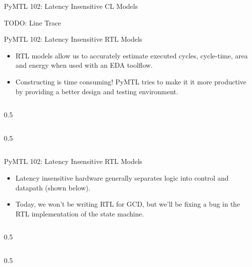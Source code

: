 \begin{frame}{PyMTL 102: Latency Insensitive CL Models}

TODO: Line Trace

\end{frame}

\begin{frame}{PyMTL 102: Latency Insensitive RTL Models}

\begin{itemize}
  \item RTL models allow us to accurately estimate executed cycles,
        cycle-time, area and energy when used with an EDA toolflow.
  \smallskip
  \item Constructing is time consuming! PyMTL tries to make it it more
        productive by providing a better design and testing environment.
\end{itemize}

  \begin{cbxcols}
  \begin{column}{0.5\tw}
  \end{column}
  \begin{column}{0.5\tw}
  \end{column}
  \end{cbxcols}
\end{frame}

\begin{frame}{PyMTL 102: Latency Insensitive RTL Models}

\begin{itemize}
  \item Latency insensitive hardware generally separates logic into
        control and datapath (shown below).
  \smallskip
  \item Today, we won’t be writing RTL for GCD, but we’ll be fixing a bug
        in the RTL implementation of the state machine.
\end{itemize}

  \begin{cbxcols}
  \begin{column}{0.5\tw}
  \end{column}
  \begin{column}{0.5\tw}
  \end{column}
  \end{cbxcols}
\end{frame}


